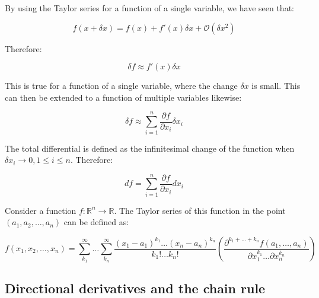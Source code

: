 \documentclass[12pt]{article}
\begin{document}
By using the Taylor series for a function of a single variable, we have seen that:

\[ f(x + \delta x) = f(x) + f'(x) \delta x + \mathcal{O}(\delta x^2) \]

Therefore:

\[ \delta f \approx f'(x) \delta x \]

This is true for a function of a single variable, where the change $\delta x$ is small. This can then be extended to a function of multiple variables likewise:

\[ \delta f \approx \sum_{i = 1}^n \frac{\partial f}{\partial x_i} \delta x_i \]

\begin{definition}
    The total differential is defined as the infinitesimal change of the function when $\delta x_i \to 0, 1 \leq i \leq n$. Therefore:

    \[ df = \sum_{i = 1}^n \frac{\partial f}{\partial x_i} dx_i \]
\end{definition}

\begin{definition}
    Consider a function $f : \mathbb{R}^n \to \mathbb{R}$. The Taylor series of this function in the point $(a_1, a_2, \dots, a_n)$ can be defined as:

    \[ f(x_1, x_2, \dots, x_n) = \sum_{k_1}^\infty \dots \sum_{k_n}^\infty \frac{(x_1 - a_1)^{k_1} \dots (x_n - a_n)^{k_n}}{k_1!\dots k_n!}\left(\frac{\partial^{k_1 + \dots + k_n} f(a_1, \dots, a_n)}{\partial x_1^{k_1} \dots \partial x_n^{k_n}}\right) \]
\end{definition}

\newpage

\subsection{Directional derivatives and the chain rule}
\end{document}

